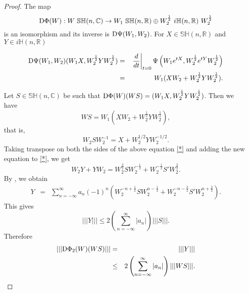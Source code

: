 \documentclass[12pt,epsfig,reqno]{amsart}
\newcommand{\C}{\mathbb{C}}
\newcommand{\R}{\mathbb{R}}
\newcommand{\De}{{\rm D}}
\theoremstyle{remark}
\begin{document}
\begin{proof}
The map
$$\De \Phi(W): W\ \mathbb {SH}(n,\C)\to W_1\ \mathbb {SH}(n,\R)\oplus W_2^{\frac{1}{2}}\ i \mathbb {H}(n,\R)\ W_2^{\frac{1}{2}}$$ is an isomorphism and its inverse is $\De \Psi(W_1,W_2)$. For $X\in \mathbb {SH}(n,\R)$ and $Y\in i \mathbb {H}(n,\R)$

\begin{eqnarray*}
\De\Psi(W_1, W_2)(W_1 X, W_2^{\frac{1}{2}}Y W_2^{\frac{1}{2}})&= &\left.\frac{d}{dt}\right|_{t=0}\Psi\left(W_1e^{tX}, W_2^{\frac{1}{2}}e^{tY}W_2^{\frac{1}{2}}\right)\\
&=& W_1(XW_2+ W_2^{\frac{1}{2}}YW_2^{\frac{1}{2}}).
\end{eqnarray*}

Let $S\in \mathbb {SH}(n,\C)$ be such that  $\De \Phi(W)(WS)= (W_1 X, W_2^{\frac{1}{2}}Y W_2^{\frac{1}{2}})$. Then we have
\begin{equation*}
WS= W_1(XW_2+ W_2^{\frac{1}{2}}YW_2^{\frac{1}{2}}),\label{mainequation_in_unitary_decomposition}
\end{equation*}
that is, \begin{equation}
W_2 S W_2^{-1} = X+W_2^{1/2} Y W_2^{-1/2}.\label{*}
\end{equation}
Taking transpose on both the sides of the above equation \eqref{*} and adding  the new equation to \eqref{*}, we get
\begin{equation}
W_2Y+YW_2= W_2^{\frac{3}{2}}SW_2^{-\frac{1}{2}}+W_2^{-\frac{1}{2}}S'W_2^{\frac{3}{2}}.\label{Y_solution}
\end{equation}
By \cite[Theorem VII.2.7]{bhatia_matrix_analysis},  we obtain
\begin{eqnarray*}
Y&=&\sum_{n=-\infty}^\infty a_n(-1)^n\left(W_2^{-n+\frac{1}{2}}SW_2^{n-\frac{1}{2}}+W_2^{-n-\frac{3}{2}}S'W_2^{n+\frac{3}{2}}\right).\label{soln1}
\end{eqnarray*}
This gives $$|||{Y}|||\leq 2\left(\sum_{n=-\infty}^{\infty} |a_n|\right) |||{S}|||.$$ Therefore
\begin{eqnarray}|||{\De\Phi_2(W)(WS)}|||
&=&|||{Y}|||\nonumber\\
&\leq& 2\left(\sum_{n=-\infty}^{\infty} |a_n|\right) |||{WS}|||.
\label{dphi_2_unitary_decompstn}\end{eqnarray}


\end{proof}
\end{document}
